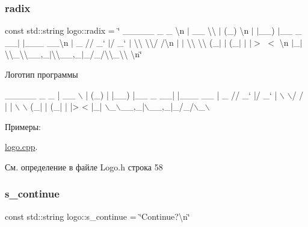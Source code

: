 \subsubsection{\texorpdfstring{radix}{radix}}
{\footnotesize\ttfamily const std\+::string logo\+::radix = \char`\"{} \+\_\+\+\_\+\+\_\+\+\_\+\+\_\+ \+\_\+ \+\_\+ \textbackslash{}n $\vert$ \+\_\+\+\_\+ \textbackslash{}\textbackslash{} $\vert$ (\+\_\+) \textbackslash{}n $\vert$ $\vert$\+\_\+\+\_\+) $\vert$\+\_\+\+\_\+ \+\_\+ \+\_\+\+\_\+$\vert$ $\vert$\+\_\+\+\_\+\+\_\+ \+\_\+\+\_\+\textbackslash{}n $\vert$ \+\_\+ // \+\_\+` $\vert$/ \+\_\+` $\vert$ \textbackslash{}\textbackslash{} \textbackslash{}\textbackslash{}/ /\textbackslash{}n $\vert$ $\vert$ \textbackslash{}\textbackslash{} \textbackslash{}\textbackslash{} (\+\_\+$\vert$ $\vert$ (\+\_\+$\vert$ $\vert$ $\vert$$>$ $<$ \textbackslash{}n $\vert$\+\_\+$\vert$ \textbackslash{}\textbackslash{}\+\_\+\textbackslash{}\textbackslash{}\+\_\+\+\_\+,\+\_\+$\vert$\textbackslash{}\textbackslash{}\+\_\+\+\_\+,\+\_\+$\vert$\+\_\+/\+\_\+/\textbackslash{}\textbackslash{}\+\_\+\textbackslash{}\textbackslash{} \textbackslash{}n\char`\"{}}

Логотип программы 
\begin{DoxyCode}
 \_\_\_\_\_           \_ \_      
|  \_\_ \(\backslash\)         | (\_)     
| |\_\_) |\_\_ \_  \_\_| |\_\_\_  \_\_
|  \_  \textcolor{comment}{// \_` |/ \_` | \(\backslash\) \(\backslash\)/ /}
| | \(\backslash\) \(\backslash\) (\_| | (\_| | |>  < 
|\_|  \(\backslash\)\_\(\backslash\)\_\_,\_|\(\backslash\)\_\_,\_|\_/\_/\(\backslash\)\_\(\backslash\)
\end{DoxyCode}
 \begin{Desc}
\item[Примеры\+: ]\par
\hyperlink{logo_8cpp-example}{logo.\+cpp}.\end{Desc}


См. определение в файле Logo.\+h строка 58

\mbox{\label{namespacelogo_a6bb2bd19b13072f69598ed9f64b77350}} 
\subsubsection{\texorpdfstring{s\+\_\+continue}{s\_continue}}
{\footnotesize\ttfamily const std\+::string logo\+::s\+\_\+continue = \char`\"{}Continue?\textbackslash{}n\char`\"{}}

